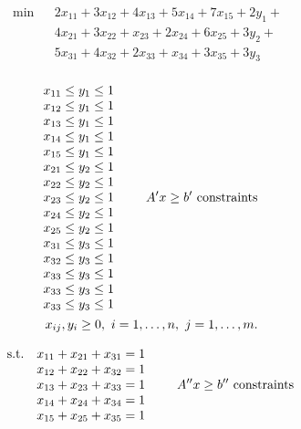 \documentclass[11pt]{article}
\begin{document}
\vskip 10pt
\begin{eqnarray*}
\min  && 2x_{11} +3 x_{12} + 4x_{13} + 5x_{14}+ 7x_{15} + 2 y_{1} + \\
&& 4x_{21} +3 x_{22} + x_{23} + 2x_{24}+  6x_{25} + 3y_{2}+ \\
&& 5x_{31} +4 x_{32} + 2 x_{33} + x_{34}+  3x_{35} +   3y_{3} \\
\end{eqnarray*}


\begin{eqnarray*}
\begin{array}{lll}
x_{11}\leq y_{1}\leq 1 & &  \\
x_{12}\leq y_{1}\leq 1 & & \\
x_{13}\leq y_{1}\leq 1 & & \\
x_{14}\leq y_{1}\leq 1 & & \\
x_{15}\leq y_{1}\leq 1 & & \\
x_{21}\leq y_{2}\leq 1 & & \\
x_{22}\leq y_{2}\leq 1 & &   \\
x_{23}\leq y_{2}\leq 1 & & \\
x_{24}\leq y_{2}\leq 1 & & \\
x_{25}\leq y_{2}\leq 1 & & \\
x_{31}\leq y_{3}\leq 1 & & \\
x_{32}\leq y_{3}\leq 1 & &\\
x_{33}\leq y_{3}\leq 1 & &\\ 
x_{33}\leq y_{3}\leq 1 & &\\ 
x_{33}\leq y_{3}\leq 1 & &\\ 
\end{array}
 A^{\prime }x \ge b^{\prime} \,\, {\rm constraints} \\
x_{ij},y_{i}\ge 0 , \,\, i = 1, \ldots, n, \, \, j = 1, \ldots, m.   
\end{eqnarray*}

 
\[
\begin{array}{llll}
{\rm s.t.} &x_{11}+x_{21}+x_{31}  = 1 & & \\
&x_{12}+x_{22}+x_{32} = 1 & &   \\
&x_{13}+x_{23}+x_{33} = 1 & &  \\
&x_{14}+x_{24}+x_{34} = 1 & &  \\
&x_{15}+x_{25}+x_{35} = 1 & &  
\end{array}   A^{\prime \prime}   x \ge b^{\prime \prime} \,\, {\rm
constraints}
\]
  
  
\end{document}
